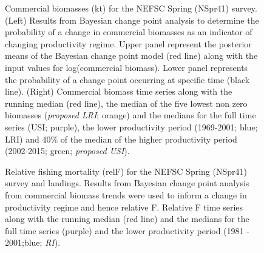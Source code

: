 \documentclass[11pt]{article}
\newcommand{\e}{/backup/bio_data/bio.lobster/figures/} %
\begin{document}
\begin{landscape}
\begin{figure}
\centering
       \caption{Commercial biomasses (kt) for the NEFSC Spring (NSpr41) survey. (Left) Results from Bayesian change point analysis to determine the probability of a change in commercial biomasses as an indicator of changing productivity regime. Upper panel represent the posterior means of the Bayesian change point model (red line) along with the input values for log(commercial biomass). Lower panel represents the probability of a change point occurring at specific time (black line). (Right) Commercial biomass time series along with the running median (red line), the median of the five lowest non zero biomasses (\emph{proposed LRI}; orange) and the medians for the full time series (USI; purple), the lower productivity period (1969-2001; blue; LRI) and 40\% of the median of the higher productivity period (2002-2015; green; \emph{proposed USI}). }

\end{figure}
\end{landscape}
     \clearpage


\begin{figure}
\centering
       \caption{Relative fishing mortality (relF) for the NEFSC Spring (NSpr41) survey and landings. Results from Bayesian change point analysis from commercial biomass trends were used to inform a change in productivity regime and hence relative F. Relative F time series along with the running median (red line) and the medians for the full time series (purple) and the lower productivity period (1981 - 2001;blue; \emph{RI}). }
\end{figure}
\end{document}
